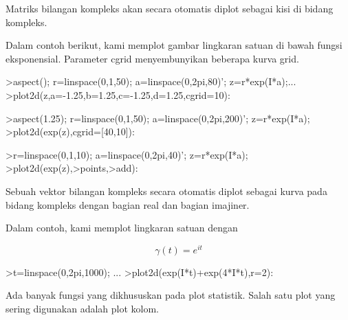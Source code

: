 \documentclass{article}
\begin{document}
\begin{eulernotebook}
\begin{eulercomment}
\begin{eulercomment}
\begin{eulercomment}
\begin{eulercomment}
\begin{eulercomment}
Matriks bilangan kompleks akan secara otomatis diplot sebagai kisi di
bidang kompleks.

Dalam contoh berikut, kami memplot gambar lingkaran satuan di bawah
fungsi eksponensial. Parameter cgrid menyembunyikan beberapa kurva
grid.
\end{eulercomment}
\begin{eulerprompt}
>aspect(); r=linspace(0,1,50); a=linspace(0,2pi,80)'; z=r*exp(I*a);...
>plot2d(z,a=-1.25,b=1.25,c=-1.25,d=1.25,cgrid=10):
\end{eulerprompt}
\begin{eulerprompt}
>aspect(1.25); r=linspace(0,1,50); a=linspace(0,2pi,200)'; z=r*exp(I*a);
>plot2d(exp(z),cgrid=[40,10]):
\end{eulerprompt}
\begin{eulerprompt}
>r=linspace(0,1,10); a=linspace(0,2pi,40)'; z=r*exp(I*a);
>plot2d(exp(z),>points,>add):
\end{eulerprompt}
\begin{eulercomment}
Sebuah vektor bilangan kompleks secara otomatis diplot sebagai kurva
pada bidang kompleks dengan bagian real dan bagian imajiner.

Dalam contoh, kami memplot lingkaran satuan dengan

\end{eulercomment}
\begin{eulerformula}
\[
\gamma(t) = e^{it}
\]
\end{eulerformula}
\begin{eulerprompt}
>t=linspace(0,2pi,1000); ...
>plot2d(exp(I*t)+exp(4*I*t),r=2):
\end{eulerprompt}
\begin{eulercomment}
Ada banyak fungsi yang dikhususkan pada plot statistik. Salah satu
plot yang sering digunakan adalah plot kolom.


\end{eulercomment}
\end{eulercomment}
\end{eulercomment}
\end{eulercomment}
\end{eulercomment}
\end{eulernotebook}
\end{document}
